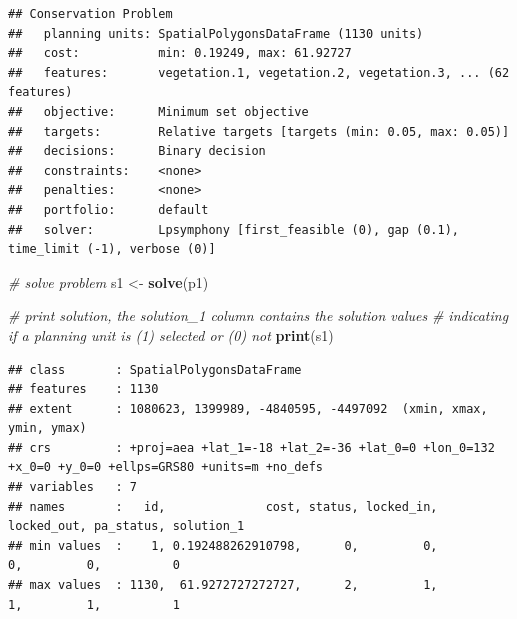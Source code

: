 \documentclass[12pt,]{book}
\newenvironment{Shaded}{\begin{snugshade}}{\end{snugshade}}
\newcommand{\KeywordTok}[1]{\textcolor[rgb]{0.13,0.29,0.53}{\textbf{#1}}}
\newcommand{\DataTypeTok}[1]{\textcolor[rgb]{0.13,0.29,0.53}{#1}}
\newcommand{\FloatTok}[1]{\textcolor[rgb]{0.00,0.00,0.81}{#1}}
\newcommand{\StringTok}[1]{\textcolor[rgb]{0.31,0.60,0.02}{#1}}
\newcommand{\CommentTok}[1]{\textcolor[rgb]{0.56,0.35,0.01}{\textit{#1}}}
\newcommand{\OtherTok}[1]{\textcolor[rgb]{0.56,0.35,0.01}{#1}}
\newcommand{\OperatorTok}[1]{\textcolor[rgb]{0.81,0.36,0.00}{\textbf{#1}}}
\newcommand{\NormalTok}[1]{#1}
\begin{document}
\begin{Shaded}
\end{Shaded}

\begin{verbatim}
## Conservation Problem
##   planning units: SpatialPolygonsDataFrame (1130 units)
##   cost:           min: 0.19249, max: 61.92727
##   features:       vegetation.1, vegetation.2, vegetation.3, ... (62 features)
##   objective:      Minimum set objective 
##   targets:        Relative targets [targets (min: 0.05, max: 0.05)]
##   decisions:      Binary decision 
##   constraints:    <none>
##   penalties:      <none>
##   portfolio:      default
##   solver:         Lpsymphony [first_feasible (0), gap (0.1), time_limit (-1), verbose (0)]
\end{verbatim}

\begin{Shaded}
\begin{Highlighting}[]
\CommentTok{# solve problem}
\NormalTok{s1 <-}\StringTok{ }\KeywordTok{solve}\NormalTok{(p1)}

\CommentTok{# print solution, the solution_1 column contains the solution values}
\CommentTok{# indicating if a planning unit is (1) selected or (0) not}
\KeywordTok{print}\NormalTok{(s1)}
\end{Highlighting}
\end{Shaded}

\begin{verbatim}
## class       : SpatialPolygonsDataFrame 
## features    : 1130 
## extent      : 1080623, 1399989, -4840595, -4497092  (xmin, xmax, ymin, ymax)
## crs         : +proj=aea +lat_1=-18 +lat_2=-36 +lat_0=0 +lon_0=132 +x_0=0 +y_0=0 +ellps=GRS80 +units=m +no_defs 
## variables   : 7
## names       :   id,              cost, status, locked_in, locked_out, pa_status, solution_1 
## min values  :    1, 0.192488262910798,      0,         0,          0,         0,          0 
## max values  : 1130,  61.9272727272727,      2,         1,          1,         1,          1
\end{verbatim}
\end{document}
